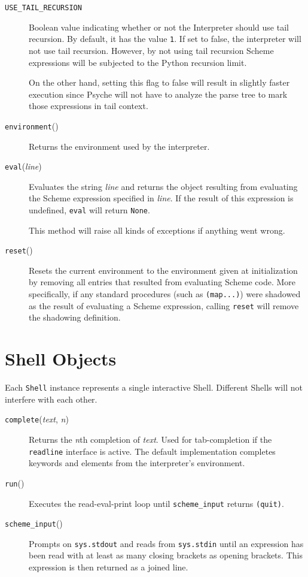 \documentclass{report}
\newcommand{\code}[1]{\texttt{#1}}
\newcommand{\file}[1]{\texttt{#1}}
\newcommand{\function}[1]{\code{#1}}
\newcommand{\param}[1]{\textmd{\textit{#1}}}
\newcommand{\member}[1]{\code{#1}}
\begin{document}
\begin{description}

\item[\member{USE\_TAIL\_RECURSION}] Boolean value indicating whether
or not the Interpreter should use tail recursion. By default, it has
the value \code{1}. If set to false, the interpreter will not use tail
recursion. However, by not using tail recursion Scheme expressions
will be subjected to the Python recursion limit.

On the other hand, setting this flag to false will result in slightly
faster execution since Psyche will not have to analyze the parse tree
to mark those expressions in tail context.


\item[\function{environment}()] Returns the environment used by the
interpreter. 

\item[\function{eval}(\param{line})] Evaluates the string \param{line}
and returns the object resulting from evaluating the Scheme expression
specified in \param{line}. If the result of this expression is
undefined, \code{eval} will return \code{None}.

This method will raise all kinds of exceptions if anything went wrong.

\item[\function{reset}()] Resets the current environment to the
environment given at initialization by removing all
entries that resulted from evaluating Scheme code. More specifically,
if any standard procedures (such as \code{(map...)}) were shadowed as
the result of evaluating a Scheme expression, calling \code{reset}
will remove the shadowing definition. 

\end{description}


\section{Shell Objects}
Each \code{Shell} instance represents a single interactive
Shell. Different Shells will not interfere with each other. 

\begin{description}

\item[\function{complete}(\param{text}, \param{n})] Returns the
\param{n}th completion of \param{text}. Used for tab-completion if the
\file{readline} interface is active. The default implementation
completes keywords and elements from the interpreter's environment. 

\item[\function{run}()] Executes the read-eval-print loop until
\function{scheme\_input} returns \code{(quit)}.

\item[\function{scheme\_input}()] Prompts on \code{sys.stdout} and
reads from \code{sys.stdin} until an expression has been read with at
least as many closing brackets as opening brackets. This expression is
then returned as a joined line.

\end{description}
\end{document}
